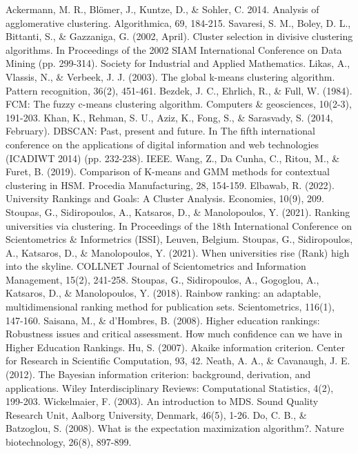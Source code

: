 \documentclass[conference]{IEEEtran}
\begin{document}
\begin{thebibliography}{00}
 Ackermann, M. R., Blömer, J., Kuntze, D., \& Sohler, C. 2014. Analysis of agglomerative clustering. Algorithmica, 69, 184-215.
 Savaresi, S. M., Boley, D. L., Bittanti, S., \& Gazzaniga, G. (2002, April). Cluster selection in divisive clustering algorithms. In Proceedings of the 2002 SIAM International Conference on Data Mining (pp. 299-314). Society for Industrial and Applied Mathematics.
 Likas, A., Vlassis, N., \& Verbeek, J. J. (2003). The global k-means clustering algorithm. Pattern recognition, 36(2), 451-461.
 Bezdek, J. C., Ehrlich, R., \& Full, W. (1984). FCM: The fuzzy c-means clustering algorithm. Computers \& geosciences, 10(2-3), 191-203.
 Khan, K., Rehman, S. U., Aziz, K., Fong, S., \& Sarasvady, S. (2014, February). DBSCAN: Past, present and future. In The fifth international conference on the applications of digital information and web technologies (ICADIWT 2014) (pp. 232-238). IEEE.
 Wang, Z., Da Cunha, C., Ritou, M., \& Furet, B. (2019). Comparison of K-means and GMM methods for contextual clustering in HSM. Procedia Manufacturing, 28, 154-159.
 Elbawab, R. (2022). University Rankings and Goals: A Cluster Analysis. Economies, 10(9), 209.
 Stoupas, G., Sidiropoulos, A., Katsaros, D., \& Manolopoulos, Y. (2021). Ranking universities via clustering. In Proceedings of the 18th International Conference on Scientometrics \& Informetrics (ISSI), Leuven, Belgium.
 Stoupas, G., Sidiropoulos, A., Katsaros, D., \& Manolopoulos, Y. (2021). When universities rise (Rank) high into the skyline. COLLNET Journal of Scientometrics and Information Management, 15(2), 241-258.
 Stoupas, G., Sidiropoulos, A., Gogoglou, A., Katsaros, D., \& Manolopoulos, Y. (2018). Rainbow ranking: an adaptable, multidimensional ranking method for publication sets. Scientometrics, 116(1), 147-160.
 Saisana, M., \& d’Hombres, B. (2008). Higher education rankings: Robustness issues and critical assessment. How much confidence can we have in Higher Education Rankings.
 Hu, S. (2007). Akaike information criterion. Center for Research in Scientific Computation, 93, 42.
 Neath, A. A., \& Cavanaugh, J. E. (2012). The Bayesian information criterion: background, derivation, and applications. Wiley Interdisciplinary Reviews: Computational Statistics, 4(2), 199-203.
 Wickelmaier, F. (2003). An introduction to MDS. Sound Quality Research Unit, Aalborg University, Denmark, 46(5), 1-26.
 Do, C. B., \& Batzoglou, S. (2008). What is the expectation maximization algorithm?. Nature biotechnology, 26(8), 897-899.

\end{thebibliography}
\vspace{12pt}
\end{document}
